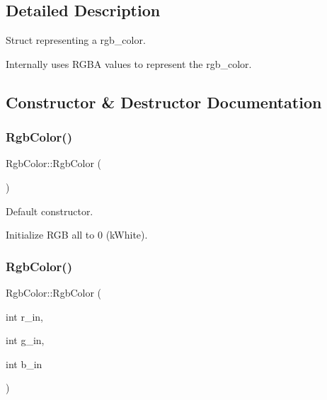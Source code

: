 \subsection{Detailed Description}
Struct representing a rgb\+\_\+color. 

Internally uses R\+G\+BA values to represent the rgb\+\_\+color. 

\subsection{Constructor \& Destructor Documentation}
\mbox{\label{struct_rgb_color_a264da0270aca412d62197e046b71b08e}} 
\subsubsection{\texorpdfstring{Rgb\+Color()}{RgbColor()}\hspace{0.1cm}{\footnotesize\ttfamily [1/2]}}
{\footnotesize\ttfamily Rgb\+Color\+::\+Rgb\+Color (\begin{DoxyParamCaption}{ }\end{DoxyParamCaption})\hspace{0.3cm}{\ttfamily [inline]}}



Default constructor. 

Initialize R\+GB all to 0 (k\+White). \mbox{\label{struct_rgb_color_a61e213533bfff019aebd27f991688222}} 
\subsubsection{\texorpdfstring{Rgb\+Color()}{RgbColor()}\hspace{0.1cm}{\footnotesize\ttfamily [2/2]}}
{\footnotesize\ttfamily Rgb\+Color\+::\+Rgb\+Color (\begin{DoxyParamCaption}\item[{int}]{r\+\_\+in,  }\item[{int}]{g\+\_\+in,  }\item[{int}]{b\+\_\+in }\end{DoxyParamCaption})\hspace{0.3cm}{\ttfamily [inline]}}



